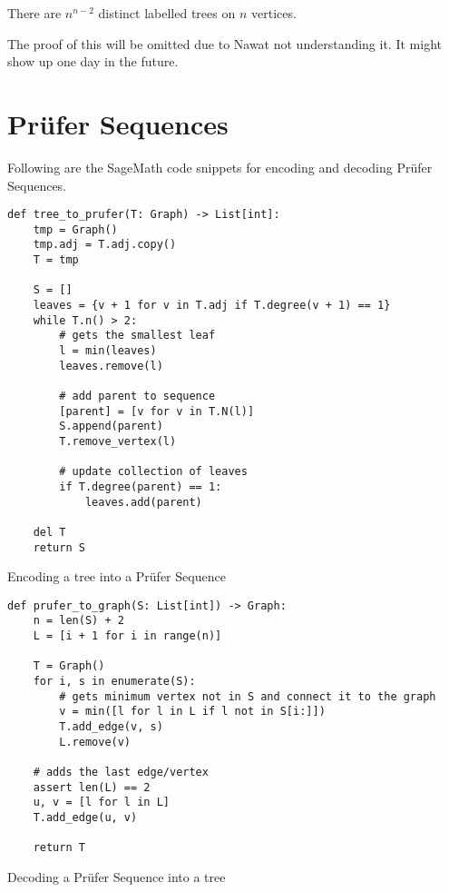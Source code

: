 \begin{theorem}
  There are \(n^{n-2}\) distinct labelled trees on \(n\) vertices.
\end{theorem}

The proof of this will be omitted due to Nawat not understanding
it. It might show up one day in the future.



\section{Pr\"ufer Sequences}

Following are the SageMath code snippets for encoding and
decoding Pr\"ufer Sequences.

\begin{listing}[ht]
\begin{verbatim}
def tree_to_prufer(T: Graph) -> List[int]:
    tmp = Graph()
    tmp.adj = T.adj.copy()
    T = tmp

    S = []
    leaves = {v + 1 for v in T.adj if T.degree(v + 1) == 1}
    while T.n() > 2:
        # gets the smallest leaf
        l = min(leaves)
        leaves.remove(l)

        # add parent to sequence
        [parent] = [v for v in T.N(l)]
        S.append(parent)
        T.remove_vertex(l)

        # update collection of leaves
        if T.degree(parent) == 1:
            leaves.add(parent)

    del T
    return S
\end{verbatim}
\caption{Encoding a tree into a Pr\"ufer Sequence}
\end{listing}

\begin{listing}[ht]
\begin{verbatim}
def prufer_to_graph(S: List[int]) -> Graph:
    n = len(S) + 2
    L = [i + 1 for i in range(n)]

    T = Graph()
    for i, s in enumerate(S):
        # gets minimum vertex not in S and connect it to the graph
        v = min([l for l in L if l not in S[i:]])
        T.add_edge(v, s)
        L.remove(v)

    # adds the last edge/vertex
    assert len(L) == 2
    u, v = [l for l in L]
    T.add_edge(u, v)

    return T  
\end{verbatim}
\caption{Decoding a Pr\"ufer Sequence into a tree}
\end{listing}

